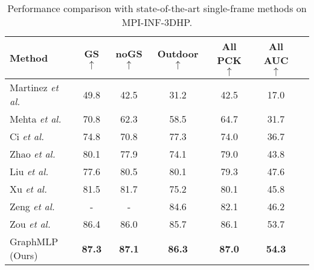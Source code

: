 \documentclass[lettersize,journal]{IEEEtran}
\begin{document}
\begin{table}[tb]
  \centering
  \caption
  {
    Performance comparison with state-of-the-art single-frame methods on MPI-INF-3DHP. 
  }
  \setlength{\tabcolsep}{1.00mm} 
  \begin{tabular}{@{}l|cccccc@{}}
  \toprule
  Method &GS $\uparrow$ &noGS $\uparrow$ &Outdoor $\uparrow$ &All PCK $\uparrow$ &All AUC $\uparrow$ \\

  \midrule
  Martinez \emph{et al.}~\cite{simplebaseline} &49.8 &42.5 &31.2 &42.5 &17.0 \\

  Mehta \emph{et al.}~\cite{mehta2017monocular} &70.8 &62.3 &58.5 &64.7 &31.7 \\

  Ci \emph{et al.}~\cite{ci2019optimizing} &74.8 &70.8 &77.3 &74.0 &36.7 \\

  Zhao \emph{et al.}~\cite{zhao2022graformer} &80.1 &77.9 &74.1 &79.0 &43.8 \\

  Liu \emph{et al.}~\cite{liu2020comprehensive} &77.6 &80.5 &80.1 &79.3 &47.6 \\

  Xu \emph{et al.}~\cite{xu2021graph} &81.5 &81.7 &75.2 &80.1 &45.8 \\

  Zeng \emph{et al.}~\cite{zeng2021learning} &- &- &84.6 &82.1 &46.2 \\

  Zou \emph{et al.}~\cite{zou2021modulated} &86.4 &86.0 &85.7 &86.1 &53.7 \\

  \midrule
  GraphMLP (Ours) &\textbf{87.3} &\textbf{87.1} &\textbf{86.3} &\textbf{87.0} &\textbf{54.3} \\

  \bottomrule
  \end{tabular}
  \label{table:3dhp}
\end{table}
\end{document}

